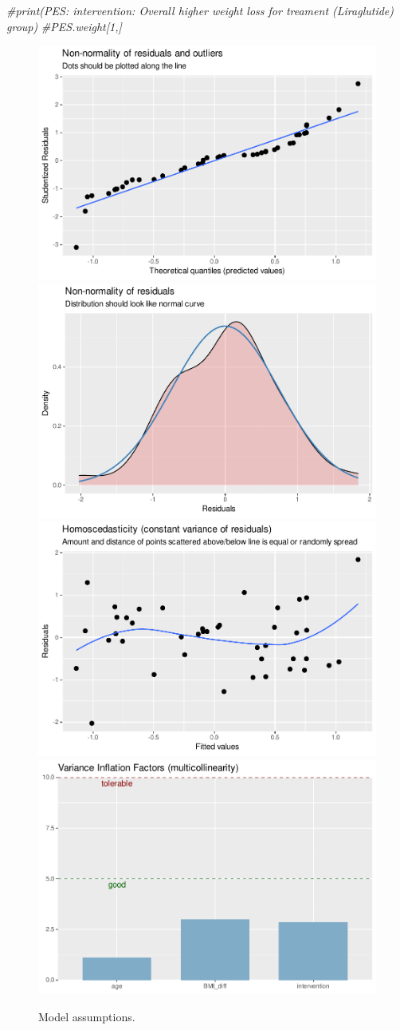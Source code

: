 \documentclass[
]{article}
\newenvironment{Shaded}{\begin{snugshade}}{\end{snugshade}}
\newcommand{\CommentTok}[1]{\textcolor[rgb]{0.56,0.35,0.01}{\textit{#1}}}
\begin{document}
\begin{Shaded}
\begin{Highlighting}[]
\CommentTok{\#print(\textquotesingle{}PES: intervention: Overall higher weight loss for treament (Liraglutide) group\textquotesingle{})}
\CommentTok{\#PES.weight[1,]}
\end{Highlighting}
\end{Shaded}

\begin{figure}

{\centering \includegraphics[width=0.25\linewidth]{OBIWAN_LIRA_files/figure-latex/unnamed-chunk-8-1} \includegraphics[width=0.25\linewidth]{OBIWAN_LIRA_files/figure-latex/unnamed-chunk-8-2} \includegraphics[width=0.25\linewidth]{OBIWAN_LIRA_files/figure-latex/unnamed-chunk-8-3} \includegraphics[width=0.25\linewidth]{OBIWAN_LIRA_files/figure-latex/unnamed-chunk-8-4} 

}

\caption{Model assumptions.}\label{fig:unnamed-chunk-8}
\end{figure}

\hfill\break
\hfill\break
\end{document}
